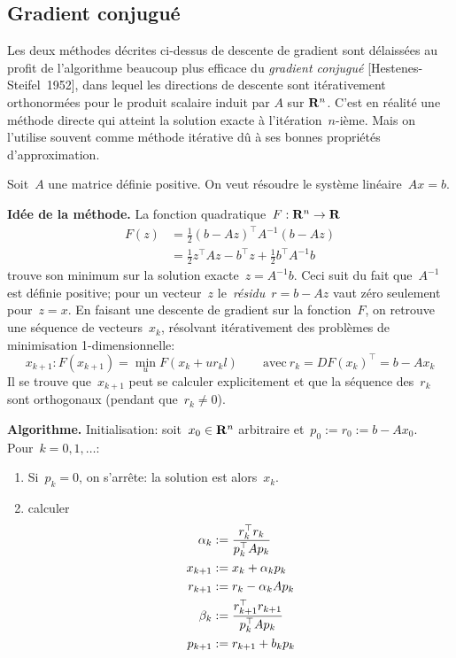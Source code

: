 \subsection{Gradient conjugué}
Les deux méthodes décrites ci-dessus de descente de gradient sont délaissées
au profit de l'algorithme beaucoup plus efficace du \emph{gradient conjugué}
[Hestenes-Steifel~1952], dans lequel les directions de descente sont
itérativement orthonormées pour le produit scalaire induit par $A$ sur
$\mathbf{R}^{n}$.
C'est en réalité une méthode directe qui atteint la solution exacte à
l'itération~$n$-ième.  Mais on l'utilise souvent comme méthode itérative dû à
ses bonnes propriétés d'approximation.

Soit~$A$ une matrice définie positive. %
On veut résoudre le système linéaire~$Ax=b$.

{\bf Idée de la méthode.}
La fonction quadratique~$F:\mathbf{R}^n\to\mathbf{R}$
\begin{align*}
	F(z) &=\tfrac12(b-Az)^\top A^{-1}(b-Az)\\
	&=\tfrac12z^\top Az-b^\top z+\tfrac12b^\top A^{-1}b
\end{align*}
trouve son minimum sur la solution exacte~$z=A^{-1}b$.
Ceci suit du fait que~$A^{-1}$ est définie positive;
pour un vecteur~$z$ le~\emph{résidu}~$r=b-Az$ vaut zéro seulement pour~$z=x$.
En faisant une descente de gradient sur la fonction~$F$, on retrouve une
séquence  de vecteurs~$x_k$, résolvant itérativement des problèmes de
minimisation 1-dimensionnelle:
\[
	x_{k+1} : F(x_{k+1})=\min_u F(x_k+u r_kl)
	\qquad
	\mathrm{avec}\ r_k = DF(x_k)^\top=b-Ax_k
\]
Il se trouve que~$x_{k+1}$ peut se calculer explicitement et que la séquence
des~$r_k$ sont orthogonaux (pendant que~$r_k\neq0$).

{\bf Algorithme.}  Initialisation: soit~$x_0\in\mathbf{R}^n$ arbitraire
et~$p_0:=r_0:=b-Ax_0$.  Pour~$k=0,1,\ldots$:
\begin{enumerate}
	\item Si~$p_k=0$, on s'arrête: la solution est alors~$x_k$.
	\item calculer
		\begin{align*}
			\displaystyle
			\alpha_k &:= \frac{r_k^\top r_k}{p_k^\top Ap_k} \\
			x_{k+1} &:= x_k+\alpha_kp_k \\
			r_{k+1} &:= r_k-\alpha_kAp_k \\
			\beta_k &:= \frac{r_{k+1}^\top r_{k+1}}{p_k^\top Ap_k} \\
		p_{k+1} &:= r_{k+1}+b_kp_k
		\end{align*}
\end{enumerate}

